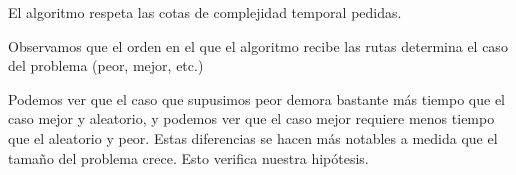 \documentclass[a4paper, 10pt, twoside]{article}
\begin{document}
El algoritmo respeta las cotas de complejidad temporal pedidas.

Observamos que el orden en el que el algoritmo recibe las rutas determina el caso del problema (peor, mejor, etc.)

Podemos ver que el caso que supusimos peor demora bastante más tiempo que el caso mejor y aleatorio, y podemos ver que el caso mejor requiere menos tiempo que el aleatorio y peor. Estas diferencias se hacen más notables a medida que el tamaño del problema crece. Esto verifica nuestra hipótesis.




\newpage
\end{document}
